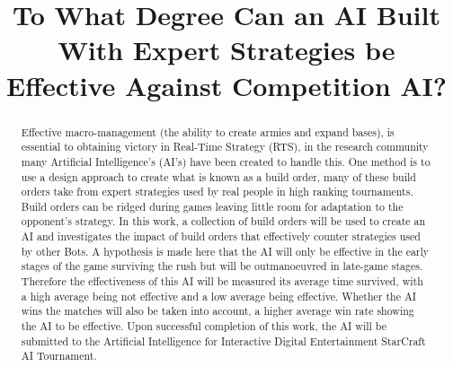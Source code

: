 \documentclass[journal]{IEEEtran}
\begin{document}
	\title{%
		To What Degree Can an AI Built With Expert Strategies be Effective Against Competition AI?} %
	
	\author{
	}
	
	
	\maketitle
	
	\begin{abstract}
		Effective macro-management (the ability to create armies and expand bases), is essential to obtaining victory in Real-Time Strategy (RTS), in the research community many Artificial Intelligence's (AI's) have been created to handle this. One method is to use a design approach to create what is known as a build order, many of these build orders take from expert strategies used by real people in high ranking tournaments. Build orders can be ridged during games leaving little room for adaptation to the opponent's strategy. In this work, a collection of build orders will be used to create an AI and investigates the impact of build orders that effectively counter strategies used by other Bots. A hypothesis is made here that the AI will only be effective in the early stages of the game surviving the rush but will be outmanoeuvred in late-game stages. Therefore the effectiveness of this AI will be measured its average time survived, with a high average being not effective and a low average being effective. Whether the AI wins the matches will also be taken into account, a higher average win rate showing the AI to be effective. Upon successful completion of this work, the AI will be submitted to the Artificial Intelligence for Interactive Digital Entertainment StarCraft AI Tournament.
	\end{abstract}
	
\end{document}
